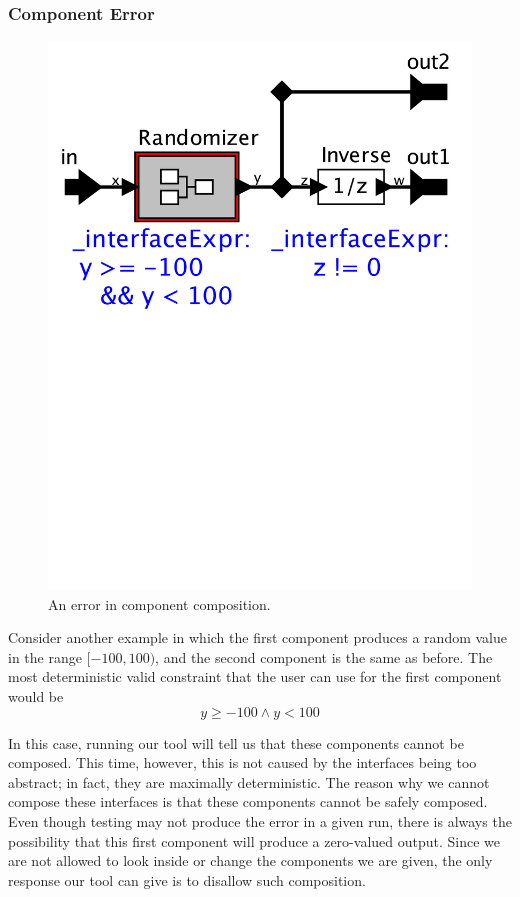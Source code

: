 \documentclass[preprint,11pt]{sigplanconf}
\begin{document}
\subsubsection{Component Error} \label{sec:componentError}
\begin{figure}[htbp]
\centering
\includegraphics[width=\columnwidth]{figs/Randomizer}
\caption{An error in component composition.}
\label{fig:randomError}
\end{figure}

Consider another example in which the first component produces a random value
in the range $[-100, 100)$, and the second component is the same as
before.
The most deterministic valid constraint that the user can use for the first
component would be
\[
y \ge -100 \wedge y < 100
\]

In this case, running our tool will tell us that these components cannot be
composed.
This time, however, this is not caused by the interfaces being too abstract;
in fact, they are maximally deterministic.
The reason why we cannot compose these interfaces is that these components
cannot be safely composed.
Even though testing may not produce the error in a given run, there is always
the possibility that this first component will produce a zero-valued output. 
Since we are not allowed to look inside or change the components we are given,
the only response our tool can give is to disallow such composition.
\end{document}
